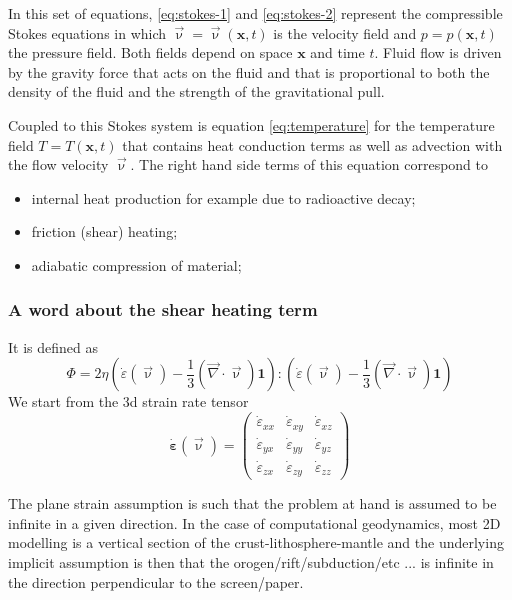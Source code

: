\documentclass[a4paper,12pt]{article}
\begin{document}
In this set of equations, \eqref{eq:stokes-1} and \eqref{eq:stokes-2}
represent the compressible Stokes equations in which $\vec\upnu =\vec\upnu (\mathbf x,t)$
is the velocity field and $p=p(\mathbf x,t)$ the pressure
field. Both fields depend on space $\mathbf x$ and time $t$. Fluid flow is
driven by the gravity force that acts on the fluid and that is proportional to
both the density of the fluid and the strength of the gravitational pull.

Coupled to this Stokes system is equation \eqref{eq:temperature} for the
temperature field $T=T(\mathbf x,t)$ that contains heat conduction terms as
well as advection with the flow velocity $\vec{\upnu}$. The right hand side
terms of this equation correspond to
\begin{itemize}
\item internal heat production for example due to radioactive decay;
\item friction (shear) heating;
\item adiabatic compression of material;
\end{itemize}



\subsubsection{A word about the shear heating term}
It is defined as
\[
\Phi=2 \eta
\left(\dot\varepsilon(\vec\upnu) - \frac{1}{3}(\vec\nabla \cdot \vec \upnu)\mathbf 1\right)
:
\left(\dot\varepsilon(\vec\upnu) - \frac{1}{3}(\vec\nabla \cdot \vec \upnu)\mathbf 1\right)
\]
We start from the 3d strain rate tensor 
\[
\dot{\bm \varepsilon}(\vec\upnu) = 
\left(
\begin{array}{ccc}
\dot{\varepsilon}_{xx} & \dot{\varepsilon}_{xy} & \dot{\varepsilon}_{xz} \\
\dot{\varepsilon}_{yx} & \dot{\varepsilon}_{yy} & \dot{\varepsilon}_{yz} \\
\dot{\varepsilon}_{zx} & \dot{\varepsilon}_{zy} & \dot{\varepsilon}_{zz} 
\end{array}
\right)
\]

The plane strain assumption is such that the problem at hand is assumed to be  
infinite in a given direction. In the case of computational geodynamics, most 2D  
modelling is a vertical section of the crust-lithosphere-mantle
and the underlying implicit assumption is then that the orogen/rift/subduction/etc ... 
is infinite in the direction perpendicular to the screen/paper.  
\end{document}
